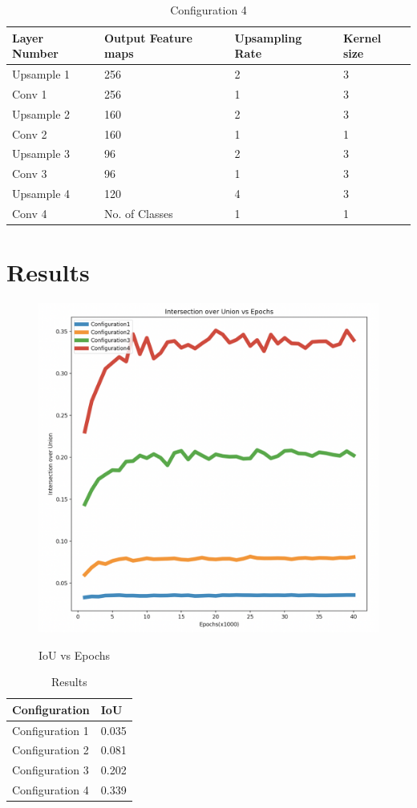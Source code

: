 \documentclass[a4paper, 12pt]{article}
\begin{document}
\begin{enumerate}
\begin{figure}[h!]
	\label{image3-threerefinement}
\end{figure}
\newpage
\begin{table}[h]
	\caption{Configuration 4}
	\begin{tabular}{|l|l|l|l|}
		\hline
		\textbf{Layer Number} & \textbf{Output Feature maps} & \textbf{Upsampling Rate} & \textbf{Kernel size} \\
		\hline
		Upsample 1 & 256 & 2 & 3\\
		\hline
		Conv 1& 256 & 1 & 3\\
		\hline
		Upsample 2& 160 & 2 & 3\\
		\hline
		Conv 2& 160 & 1 & 1\\
		\hline
		Upsample 3& 96 & 2 & 3\\
		\hline
		Conv 3& 96 & 1 & 3\\
		\hline
		Upsample 4& 120 & 4 & 3\\
		\hline
		Conv 4& No. of Classes & 1 & 1\\
		\hline
	\end{tabular}
\end{table}
\end{enumerate}
\section{Results}
\begin{figure}[h!]
	\centering
	\includegraphics[width=0.7\linewidth, height=0.32\textheight]{iouvsepoch}
	\label{image4-iouvsepoch}
	\caption{IoU vs Epochs}
\end{figure}
\begin{table}[h]
	\caption{Results}
	\centering
	\begin{tabular}{|l|l|}
		\hline
		\textbf{Configuration} & \textbf{IoU} \\
		\hline
		Configuration 1 & 0.035\\
		\hline
		Configuration 2& 0.081\\
		\hline
		Configuration 3& 0.202\\
		\hline
		Configuration 4& 0.339\\
		\hline
	\end{tabular}
\end{table}
\newpage
\end{document}
